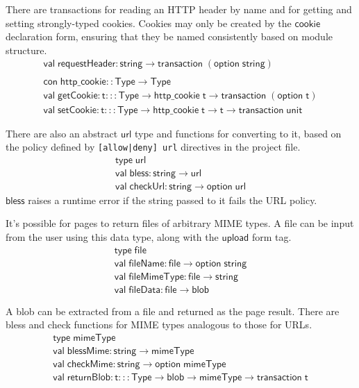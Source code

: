 \documentclass{article}
\newcommand{\mt}[1]{\mathsf{#1}}
\begin{document}
There are transactions for reading an HTTP header by name and for getting and setting strongly-typed cookies.  Cookies may only be created by the $\mt{cookie}$ declaration form, ensuring that they be named consistently based on module structure.
$$\begin{array}{l}
  \mt{val} \; \mt{requestHeader} : \mt{string} \to \mt{transaction} \; (\mt{option} \; \mt{string}) \\
  \\
  \mt{con} \; \mt{http\_cookie} :: \mt{Type} \to \mt{Type} \\
  \mt{val} \; \mt{getCookie} : \mt{t} ::: \mt{Type} \to \mt{http\_cookie} \; \mt{t} \to \mt{transaction} \; (\mt{option} \; \mt{t}) \\
  \mt{val} \; \mt{setCookie} : \mt{t} ::: \mt{Type} \to \mt{http\_cookie} \; \mt{t} \to \mt{t} \to \mt{transaction} \; \mt{unit}
\end{array}$$

There are also an abstract $\mt{url}$ type and functions for converting to it, based on the policy defined by \texttt{[allow|deny] url} directives in the project file.
$$\begin{array}{l}
  \mt{type} \; \mt{url} \\
  \mt{val} \; \mt{bless} : \mt{string} \to \mt{url} \\
  \mt{val} \; \mt{checkUrl} : \mt{string} \to \mt{option} \; \mt{url}
\end{array}$$
$\mt{bless}$ raises a runtime error if the string passed to it fails the URL policy.

It's possible for pages to return files of arbitrary MIME types.  A file can be input from the user using this data type, along with the $\mt{upload}$ form tag.
$$\begin{array}{l}
  \mt{type} \; \mt{file} \\
  \mt{val} \; \mt{fileName} : \mt{file} \to \mt{option} \; \mt{string} \\
  \mt{val} \; \mt{fileMimeType} : \mt{file} \to \mt{string} \\
  \mt{val} \; \mt{fileData} : \mt{file} \to \mt{blob}
\end{array}$$

A blob can be extracted from a file and returned as the page result.  There are bless and check functions for MIME types analogous to those for URLs.
$$\begin{array}{l}
  \mt{type} \; \mt{mimeType} \\
  \mt{val} \; \mt{blessMime} : \mt{string} \to \mt{mimeType} \\
  \mt{val} \; \mt{checkMime} : \mt{string} \to \mt{option} \; \mt{mimeType} \\
  \mt{val} \; \mt{returnBlob} : \mt{t} ::: \mt{Type} \to \mt{blob} \to \mt{mimeType} \to \mt{transaction} \; \mt{t}
\end{array}$$
\end{document}
